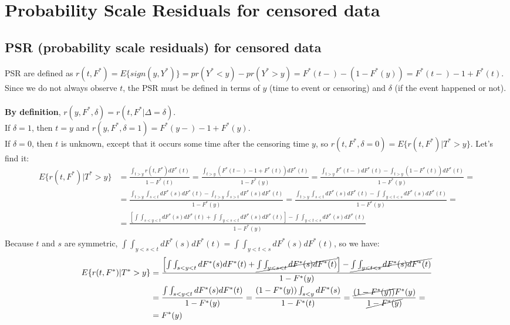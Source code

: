 \documentclass[]{article}
\begin{document}
\section{Probability Scale Residuals for censored data}
\subsection{PSR (probability scale residuals) for censored data}
PSR are defined as $r(t,F^*) = E\{sign(y,Y^*)\} = pr(Y^* < y) - pr(Y^* > y) = F^*(t-) - (1-F^*(y)) = F^*(t-) - 1 + F^*(t)$.\\
Since we do not always observe $t$, the PSR must be defined in terms of $y$ (time to event or censoring) and $\delta$ (if the event happened or not). \\
\\
\textbf{By definition}, $r(y,F^*, \delta) = r(t,F^*|\Delta=\delta)$.\\
If $\delta = 1$, then $t=y$ and $r(y,F^*, \delta=1) = F^*(y-) - 1 + F^*(y)$. \\
If $\delta = 0$, then $t$ is unknown, except that it occurs some time after the censoring time $y$, so $r(t,F^*, \delta=0) = E\{r(t,F^*)|T^*>y\}$. Let's find it:
	$$
	\begin{aligned}
		E\{r(t,F^*)|T^*>y\} &= \frac{\int_{t>y}r(t,F^*)dF^*(t)}{1-F^*(t)}= \frac{\int_{t>y}(F^*(t-) - 1 + F^*(t))dF^*(t)}{1-F^*(y)}= \frac{\int_{t>y}F^*(t-)dF^*(t) - \int_{t>y}(1 - F^*(t))dF^*(t)}{1-F^*(y)}=\\
		&= \frac{\int_{t>y}\int_{s<t}dF^*(s)dF^*(t) - \int_{t>y}\int_{s>t}dF^*(s)dF^*(t)}{1-F^*(y)}= \frac{\int_{t>y}\int_{s<t}dF^*(s)dF^*(t) - \int\int_{y<t<s}dF^*(s)dF^*(t)}{1-F^*(y)}=\\
		&= \frac{\left[\int\int_{s<y<t}dF^*(s)dF^*(t) + \int\int_{y<s<t}dF^*(s)dF^*(t)\right] - \int\int_{y<t<s}dF^*(s)dF^*(t)}{1-F^*(y)}\\
	\end{aligned}
	$$
Because $t$ and $s$ are symmetric, $\int\int_{y<s<t}dF^*(s)dF^*(t) = \int\int_{y<t<s}dF^*(s)dF^*(t)$, so we have:
	$$
	\begin{aligned}
		E\{r(t,F^*)|T^*>y\} &= \frac{\left[\int\int_{s<y<t}dF^*(s)dF^*(t) + \cancel{\int\int_{y<s<t}dF^*(s)dF^*(t)}\right] - \cancel{\int\int_{y<t<s}dF^*(s)dF^*(t)}}{1-F^*(y)}\\
		&= \frac{\int\int_{s<y<t}dF^*(s)dF^*(t)}{1-F^*(y)} = \frac{(1-F^*(y))\int_{s<y}dF^*(s)}{1-F^*(t)} = \frac{\cancel{(1-F^*(y))}F^*(y)}{\cancel{1-F^*(y)}} =\\
		&=F^*(y)
	\end{aligned}
	$$
	
\end{document}
